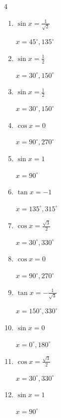 \begin{multicols}{4}
\begin{enumerate}
  \item $\displaystyle \sin{x}  = \frac{1}{\sqrt{2}}$

        $\displaystyle x = 45^{\circ} , 135^{\circ}$

  \item $\displaystyle \sin{x}  = \frac{1}{2}$

        $\displaystyle x = 30^{\circ} , 150^{\circ}$

  \item $\displaystyle \sin{x}  = \frac{1}{2}$

        $\displaystyle x = 30^{\circ} , 150^{\circ}$

  \item $\displaystyle \cos{x}  = 0$

        $\displaystyle x = 90^{\circ} , 270^{\circ}$

  \item $\displaystyle \sin{x}  = 1$

        $\displaystyle x = 90^{\circ}$

  \item $\displaystyle \tan{x}  = -1$

        $\displaystyle x = 135^{\circ} , 315^{\circ}$

\columnbreak %

  \item $\displaystyle \cos{x}  = \frac{\sqrt{3}}{2}$

        $\displaystyle x = 30^{\circ} , 330^{\circ}$

  \item $\displaystyle \cos{x}  = 0$

        $\displaystyle x = 90^{\circ} , 270^{\circ}$

  \item $\displaystyle \tan{x}  = -\frac{1}{\sqrt{3}}$

        $\displaystyle x = 150^{\circ} , 330^{\circ}$

  \item $\displaystyle \sin{x}  = 0$

        $\displaystyle x = 0^{\circ} , 180^{\circ}$

  \item $\displaystyle \cos{x}  = \frac{\sqrt{3}}{2}$

        $\displaystyle x = 30^{\circ} , 330^{\circ}$

  \item $\displaystyle \sin{x}  = 1$

        $\displaystyle x = 90^{\circ}$


\end{enumerate}
\end{multicols}
